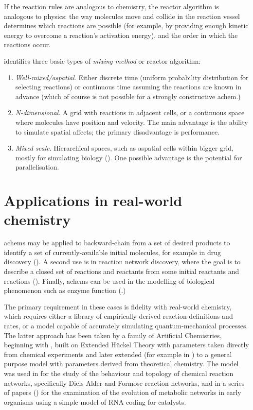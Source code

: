 If the reaction rules are analogous to chemistry, the reactor algorithm is analogous to physics: the way molecules move and collide in the reaction vessel determines which reactions are possible (for example, by providing enough kinetic energy to overcome a reaction's activation energy), and the order in which the reactions occur.

\Textcite{Faulconbridge2011} identifies three basic types of \emph{mixing method} or reactor algorithm:
\begin{enumerate}
	\item
	\emph{Well-mixed/aspatial}. Either discrete time (uniform probability distribution for selecting reactions) or continuous time \parencite{Gillespie1976} assuming the reactions are known in advance (which of course is not possible for a strongly constructive \gls{achem}.)
	\item
	\emph{N-dimensional}. A grid with reactions in adjacent cells, or a continuous space where molecules have position and velocity. The main advantage is the ability to simulate spatial affects; the primary disadvantage is performance.
	\item
	\emph{Mixed scale}. Hierarchical spaces, such as aspatial cells within bigger grid, mostly for simulating biology (\eg \textcite{Jeschke2008}). One possible advantage is the potential for parallelisation.
\end{enumerate}

\section{Applications in real-world chemistry}\label{applications-in-real-world-chemistry}

\Glspl{achem} may be applied to backward-chain from a set of desired products to identify a set of currently-available initial molecules, for example in drug discovery (\eg \textcite{Hartenfeller2011}). A second use is in reaction network discovery, where the goal is to describe a closed set of reactions and reactants from some initial reactants and reactions (\eg \textcite{Faulon2001}). Finally, \glspl{achem} can be used in the modelling of biological phenomenon such as enzyme function (\eg \textcite{Flamm2010}.)

The primary requirement in these cases is fidelity with real-world chemistry, which requires either a library of empirically derived reaction definitions and rates, or a model capable of accurately simulating quantum-mechanical processes. The latter approach has been taken by a family of Artificial Chemistries, beginning with \textcite{Benko2003}, built on Extended H\"{u}ckel Theory with parameters taken directly from chemical experiments and later extended (for example in \textcite{Benko2005}) to a general purpose model with parameters derived from theoretical chemistry. The model was used in \textcite{Hogerl2010} for the study of the behaviour and topology of chemical reaction networks, specifically Diels-Alder and Formose reaction networks, and in a series of papers (\eg \textcite{Flamm2010,Ullrich2010}) for the examination of the evolution of metabolic networks in early organisms using a simple model of RNA coding for catalysts.

